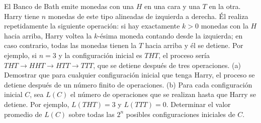 El Banco de Bath emite monedas con una $H$ en una cara y una $T$ en la otra. Harry tiene $n$ monedas de este tipo alineadas de izquierda a derecha. Él realiza repetidamente la siguiente operación: si hay exactamente $k \gt 0$ monedas con la $H$ hacia arriba, Harry voltea la $k$-ésima moneda contando desde la izquierda; en caso contrario, todas las monedas tienen la $T$ hacia arriba y él se detiene. Por ejemplo, si $n = 3$ y la configuración inicial es $THT$, el proceso sería $THT \to HHT \to HTT \to TTT$, que se detiene después de tres operaciones.
(a) Demostrar que para cualquier configuración inicial que tenga Harry, el proceso se detiene después de un número finito de operaciones.
(b) Para cada configuración inicial $C$, sea $L(C)$ el número de operaciones que se realizan hasta que Harry se detiene. Por ejemplo, $L(THT) = 3$ y $L(TTT) = 0$. Determinar el valor promedio de $L(C)$ sobre todas las $2^n$ posibles configuraciones iniciales de $C$.